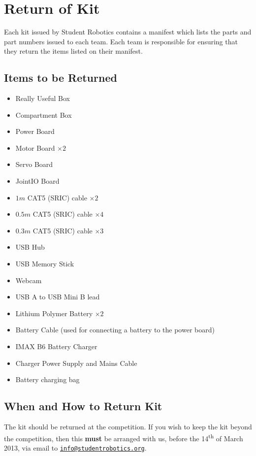 \section {Return of Kit}
\label{sec:kit-return}

Each kit issued by Student Robotics contains a manifest which lists the parts and part numbers issued to each team.
Each team is responsible for ensuring that they return the items listed on their manifest.

\subsection {Items to be Returned}

\begin{itemize}
 \item Really Useful Box
 \item Compartment Box
\end{itemize}

\begin{itemize}
 \item Power Board
 \item Motor Board $\times 2$
 \item Servo Board
 \item JointIO Board
 \item $  1m$ CAT5 (SRIC) cable $\times 2$
 \item $0.5m$ CAT5 (SRIC) cable $\times 4$
 \item $0.3m$ CAT5 (SRIC) cable $\times 3$
\end{itemize}

\begin{itemize}
 \item USB Hub
 \item USB Memory Stick
 \item Webcam
 \item USB A to USB Mini B lead
\end{itemize}

\begin{itemize}
 \item Lithium Polymer Battery $\times 2$
 \item Battery Cable (used for connecting a battery to the power board)
 \item IMAX B6 Battery Charger
 \item Charger Power Supply and Mains Cable
 \item Battery charging bag
\end{itemize}

\subsection {When and How to Return Kit}

The kit should be returned at the competition.
If you wish to keep the kit beyond the competition, then this \textbf{must} be arranged with us,
 before the 14\textsuperscript{th} of March 2013, via email to \href{mailto:info@studentrobotics.org}{\nolinkurl{info@studentrobotics.org}}.
